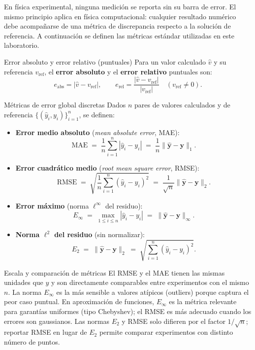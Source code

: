 En física experimental, ninguna medición se reporta sin su barra de error.
El mismo principio aplica en física computacional: cualquier resultado
numérico debe acompañarse de una métrica de discrepancia respecto a la
solución de referencia. A continuación se definen las métricas estándar
utilizadas en este laboratorio.

\begin{definicion}{Error absoluto y error relativo (puntuales)}
\label{def:error_puntual}
Para un valor calculado $\hat{v}$ y su referencia $v_{\mathrm{ref}}$, el
\textbf{error absoluto} y el \textbf{error relativo} puntuales son:
\[
  e_{\mathrm{abs}} = |\hat{v} - v_{\mathrm{ref}}|,
  \qquad
  e_{\mathrm{rel}} = \frac{|\hat{v} - v_{\mathrm{ref}}|}{|v_{\mathrm{ref}}|}
  \quad (v_{\mathrm{ref}} \neq 0).
\]
\end{definicion}

\begin{definicion}{Métricas de error global discretas}
\label{def:metricas_discretas}
Dados $n$ pares de valores calculados y de referencia
$\{(\hat{y}_i, y_i)\}_{i=1}^n$, se definen:

\begin{itemize}[nosep, leftmargin=1.5em]
  \item \textbf{Error medio absoluto} (\textit{mean absolute error}, MAE):
  \[
    \mathrm{MAE} \;=\; \frac{1}{n}\sum_{i=1}^n |\hat{y}_i - y_i|
    \;=\; \frac{1}{n}\|\hat{\mathbf{y}} - \mathbf{y}\|_1.
  \]
  \item \textbf{Error cuadrático medio} (\textit{root mean square error}, RMSE):
  \[
    \mathrm{RMSE} \;=\; \sqrt{\frac{1}{n}\sum_{i=1}^n (\hat{y}_i - y_i)^2}
    \;=\; \frac{1}{\sqrt{n}}\|\hat{\mathbf{y}} - \mathbf{y}\|_2.
  \]
  \item \textbf{Error máximo} (norma $\ell^\infty$ del residuo):
  \[
    E_\infty \;=\; \max_{1 \leq i \leq n}|\hat{y}_i - y_i|
    \;=\; \|\hat{\mathbf{y}} - \mathbf{y}\|_\infty.
  \]
  \item \textbf{Norma $\ell^2$ del residuo} (sin normalizar):
  \[
    E_2 \;=\; \|\hat{\mathbf{y}} - \mathbf{y}\|_2
    \;=\; \sqrt{\sum_{i=1}^n (\hat{y}_i - y_i)^2}.
  \]
\end{itemize}
\end{definicion}

\begin{observacion}{Escala y comparación de métricas}
El RMSE y el MAE tienen las mismas unidades que $y$ y son directamente
comparables entre experimentos con el mismo $n$. La norma $E_\infty$ es
la más sensible a valores atípicos (outliers) porque captura el peor caso
puntual. En aproximación de funciones, $E_\infty$ es la métrica relevante
para garantías uniformes (tipo Chebyshev); el RMSE es más adecuado cuando
los errores son gaussianos. Las normas $E_2$ y RMSE solo difieren por el
factor $1/\sqrt{n}$; reportar RMSE en lugar de $E_2$ permite comparar
experimentos con distinto número de puntos.
\end{observacion}

